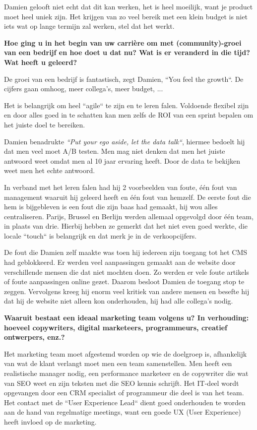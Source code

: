 Damien gelooft niet echt dat dit kan werken, het is heel moeilijk, want je product moet heel uniek zijn. Het krijgen van zo veel bereik met een klein budget is niet iets wat op lange termijn zal werken, stel dat het werkt. 
	
\textbf{Hoe ging u in het begin van uw carrière om met (community)-groei van een bedrijf en hoe doet u dat nu? Wat is er veranderd in die tijd? Wat heeft u geleerd?}

De groei van een bedrijf is fantastisch, zegt Damien, ``You feel the growth``. De cijfers gaan omhoog, meer collega's, meer budget, ...

Het is belangrijk om heel ``agile`` te zijn en te leren falen. Voldoende flexibel zijn en door alles goed in te schatten kan men zelfs de ROI van een sprint bepalen om het juiste doel te bereiken. 

Damien benadrukte \emph{``Put your ego aside, let the data talk``}, hiermee bedoelt hij dat men veel moet A/B testen. Men mag niet denken dat men het juiste antwoord weet omdat men al 10 jaar ervaring heeft. Door de data te bekijken weet men het echte antwoord.
	
In verband met het leren falen had hij 2 voorbeelden van foute, één fout van management waaruit hij geleerd heeft en één fout van hemzelf. De eerste fout die hem is bijgebleven is een fout die zijn baas had gemaakt, hij wou alles centraliseren. Parijs, Brussel en Berlijn werden allemaal opgevolgd door één team, in plaats van drie. Hierbij hebben ze gemerkt dat het niet even goed werkte, die locale ``touch`` is belangrijk en dat merk je in de verkoopcijfers. 

De fout die Damien zelf maakte was toen hij iedereen zijn toegang tot het CMS had geblokkeerd. Er werden veel aanpassingen gemaakt aan de website door verschillende mensen die dat niet mochten doen. Zo werden er vele foute artikels of foute aanpassingen online gezet. Daarom besloot Damien de toegang stop te zeggen. Vervolgens kreeg hij enorm veel kritiek van andere mensen en besefte hij dat hij de website niet alleen kon onderhouden, hij had alle collega's nodig.

\textbf{Waaruit bestaat een ideaal marketing team volgens u? In verhouding: hoeveel copywriters, digital marketeers, programmeurs, creatief ontwerpers, enz.?}
	
Het marketing team moet afgestemd worden op wie de doelgroep is, afhankelijk van wat de klant verlangt moet men een team samenstellen. Men heeft een realistische manager nodig, een performance marketeer en de copywriter die wat van SEO weet en zijn teksten met die SEO kennis schrijft. Het IT-deel wordt opgevangen door een CRM specialist of programmeur die deel is van het team. Het contact met de ``User Experience Lead`` dient goed onderhouden te worden aan de hand van regelmatige meetings, want een goede UX (User Experience) heeft invloed op de marketing.
	
